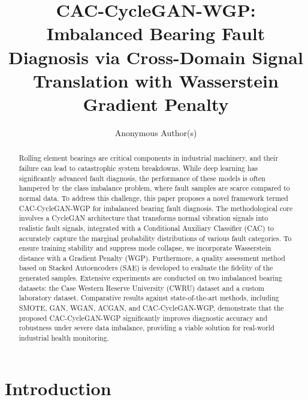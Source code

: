 \documentclass[twocolumn]{IEEEtran}
\begin{document}
\title{CAC-CycleGAN-WGP: Imbalanced Bearing Fault Diagnosis via Cross-Domain Signal Translation with Wasserstein Gradient Penalty}
\author{Anonymous Author(s)}
\maketitle

\begin{abstract}
Rolling element bearings are critical components in industrial machinery, and their failure can lead to catastrophic system breakdowns. While deep learning has significantly advanced fault diagnosis, the performance of these models is often hampered by the class imbalance problem, where fault samples are scarce compared to normal data. To address this challenge, this paper proposes a novel framework termed CAC-CycleGAN-WGP for imbalanced bearing fault diagnosis. The methodological core involves a CycleGAN architecture that transforms normal vibration signals into realistic fault signals, integrated with a Conditional Auxiliary Classifier (CAC) to accurately capture the marginal probability distributions of various fault categories. To ensure training stability and suppress mode collapse, we incorporate Wasserstein distance with a Gradient Penalty (WGP). Furthermore, a quality assessment method based on Stacked Autoencoders (SAE) is developed to evaluate the fidelity of the generated samples. Extensive experiments are conducted on two imbalanced bearing datasets: the Case Western Reserve University (CWRU) dataset and a custom laboratory dataset. Comparative results against state-of-the-art methods, including SMOTE, GAN, WGAN, ACGAN, and CAC-CycleGAN-WGP, demonstrate that the proposed CAC-CycleGAN-WGP significantly improves diagnostic accuracy and robustness under severe data imbalance, providing a viable solution for real-world industrial health monitoring.
\end{abstract}

\section{Introduction}
\label{sec:intro}
\end{document}
